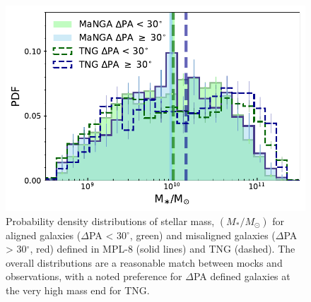 \documentclass[fleqn,usenatbib]{mnras}
\newcommand{\red}[1]{{\textcolor{red}{#1}}}
\begin{document}
\begin{figure}
	\includegraphics[width=\linewidth]{tng_appendix/delPA_split_stelM_tng_comparison.pdf}
    \caption{Probability density distributions of stellar mass, $(M_{\ast}/M_{\odot})$ for aligned galaxies ($\Delta$PA < 30$^{\circ}$, green) and misaligned galaxies ($\Delta$PA > 30$^{\circ}$, red) defined in MPL-8 (solid lines) and TNG (dashed). The overall distributions are a reasonable match between mocks and observations, with a noted preference for $\Delta$PA defined galaxies at the very high mass end for TNG.}
    \label{fig:TNG_mpl8_stelM}
\end{figure}


\end{document}
